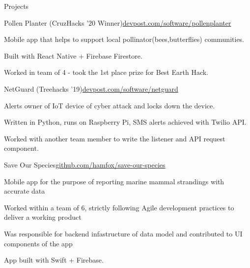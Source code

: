 \documentclass{resume} %
\begin{document}
\begin{rSection}{Projects}

    \begin{rSubsection}{Pollen Planter (CruzHacks '20 Winner)}{\href{https://www.devpost.com/software/pollenplanter}{devpost.com/software/pollenplanter}}{}{}
        \item Mobile app that helps to support local pollinator(bees,butterflies) communities.
        \item Built with React Native + Firebase Firestore.
        \item Worked in team of 4 - took the 1st place prize for Best Earth Hack.
    \end{rSubsection}

    \begin{rSubsection}{NetGuard (Treehacks '19)}{\href{https://www.devpost.com/software/netguard}{devpost.com/software/netguard}}{}{}
        \item Alerts owner of IoT device of cyber attack and locks down the device.
        \item Written in Python, runs on Raspberry Pi, SMS alerts achieved with Twilio API.
        \item Worked with another team member to write the listener and API request component.
    \end{rSubsection}

    \begin{rSubsection}{Save Our Species}{\href{https://github.com/hamfox/save-our-species}{github.com/hamfox/save-our-species}}{}{}
        \item Mobile app for the purpose of reporting marine mammal strandings with accurate data
        \item Worked within a team of 6, strictly following Agile development practices to deliver a working product 
        \item Was responsible for backend infastructure of data model and contributed to UI components of the app
        \item App built with Swift + Firebase.
    \end{rSubsection}

\end{rSection}



\end{document}
